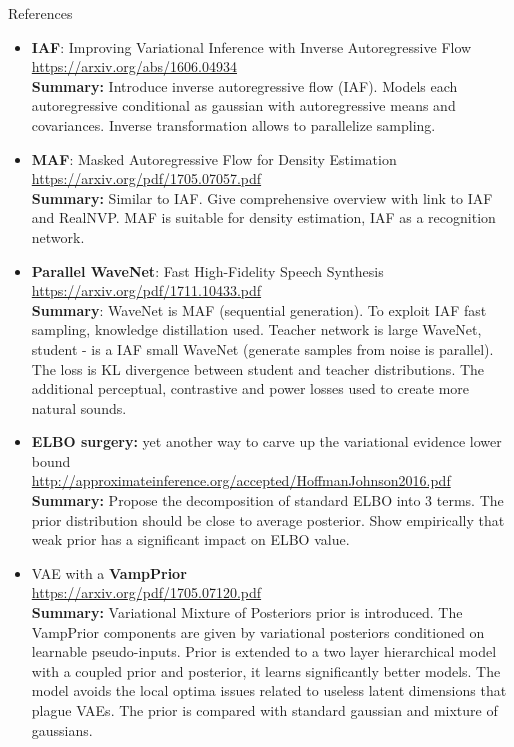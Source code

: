 \documentclass{beamer}
\begin{document}
\begin{frame}{References}
{\tiny
\begin{itemize}
	
	\item \textbf{IAF}: Improving Variational Inference with Inverse Autoregressive Flow \\
	\href{https://arxiv.org/abs/1606.04934}{https://arxiv.org/abs/1606.04934} \\
	\textbf{Summary:} Introduce inverse autoregressive flow (IAF). Models each autoregressive conditional as gaussian with autoregressive means and covariances. Inverse transformation allows to parallelize sampling.
	
	\item \textbf{MAF}: Masked Autoregressive Flow for Density Estimation \\ 
	\href{https://arxiv.org/pdf/1705.07057.pdf}{https://arxiv.org/pdf/1705.07057.pdf} \\
	\textbf{Summary:} Similar to IAF. Give comprehensive overview with link to IAF and RealNVP.  MAF is suitable for density estimation, IAF as a recognition network.
	
	\item \textbf{Parallel WaveNet}: Fast High-Fidelity Speech Synthesis \\
	\href{https://arxiv.org/pdf/1711.10433.pdf}{https://arxiv.org/pdf/1711.10433.pdf} \\
	\textbf{Summary}: WaveNet is MAF (sequential generation). To exploit IAF fast sampling, knowledge distillation used. Teacher network is large WaveNet, student - is a IAF small WaveNet (generate samples from noise is parallel). The loss is KL divergence between student and teacher distributions. The additional perceptual, contrastive and power losses used to create more natural sounds.
	
	\item \textbf{ELBO surgery:} yet another way to carve up the variational evidence lower bound \\
	\href{http://approximateinference.org/accepted/HoffmanJohnson2016.pdf}{http://approximateinference.org/accepted/HoffmanJohnson2016.pdf} \\
	\textbf{Summary:} Propose the decomposition of standard ELBO into 3 terms. The prior distribution should be close to average posterior. Show empirically that weak prior has a significant impact on ELBO value.
	
	\item VAE with a \textbf{VampPrior} \\
	\href{https://arxiv.org/pdf/1705.07120.pdf}{https://arxiv.org/pdf/1705.07120.pdf} \\
	\textbf{Summary:} Variational Mixture of Posteriors prior is introduced. The VampPrior components are given by variational posteriors conditioned on learnable pseudo-inputs. Prior is extended to a two layer hierarchical model with a coupled prior and posterior, it learns significantly better models. The model avoids the local optima issues related to useless latent dimensions that plague VAEs. The prior is compared with standard gaussian and mixture of gaussians.
\end{itemize}
}
\end{frame}
\end{document}
